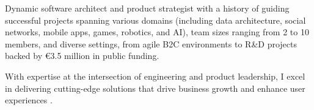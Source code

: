 
\vspace{1ex}


\begin{cvparagraph}


Dynamic software architect and product strategist with a history of guiding successful projects spanning various domains (including data architecture, social networks, mobile apps, games, robotics, and AI), team sizes ranging from 2 to 10 members, and diverse settings, from agile B2C environments to R\&D projects backed by €3.5 million in public funding.

With expertise at the intersection of engineering and product leadership, I excel in delivering cutting-edge solutions that drive business growth and enhance user experiences .

\end{cvparagraph}
